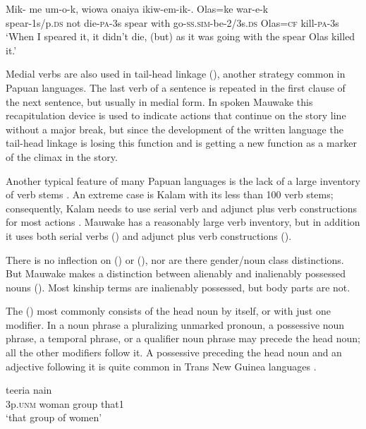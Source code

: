  
\ea%
\label{ex:1:x663}
\gll Mik-   me  um-o-k,  wiowa  onaiya  ikiw-em-ik-. Olas=ke  war-e-k\\
spear-1s/p.\textsc{ds}  not  die-\textsc{pa}-3s  spear  with  go-\textsc{ss.sim}-be-2/3s.\textsc{ds} Olas=\textsc{cf}  kill-\textsc{pa}-3s\\
\glt`When I speared it, it didn't die, (but) as it was going with the spear Olas killed it.'
\z


Medial verbs are also used in tail-head linkage (), another strategy common in Papuan languages. The last verb of a sentence is repeated in the first clause of the next sentence, but usually in medial form.  In spoken Mauwake this recapitulation device is used to indicate actions that continue on the story line without a major break, but since the development of the written language the tail-head linkage is losing this function and is getting a new function as a  marker of the climax in the story.

Another typical feature of many Papuan languages is the lack of a large inventory of verb stems \citep[127]{Foley1986}. An extreme case is Kalam with its less than 100 verb stems; consequently, Kalam needs to use serial verb and adjunct plus verb constructions for most actions \citep[336--337]{Pawley1987}. Mauwake has a reasonably large verb inventory, but in addition it uses both serial verbs () and adjunct plus verb constructions ().

There is no inflection on  () or (), nor are there gender/noun class distinctions. But Mauwake makes a distinction between alienably and inalienably possessed nouns ().  Most kinship terms are inalienably possessed, but body parts are not.

The  () most commonly consists of the head noun by itself, or with just one modifier.  In a noun phrase a pluralizing  unmarked pronoun, a possessive noun phrase, a temporal phrase, or a qualifier noun phrase may precede the head noun; all the other modifiers follow it. A possessive preceding the head noun and an adjective following it  is quite common in Trans New Guinea languages \citep[19]{Reesink1987}. 

\ea%
\label{ex:1:x658}
\gll {}   teeria  nain \\
 3p.\textsc{unm}  woman  group  that1     \\
\glt `that group of women'
\z


